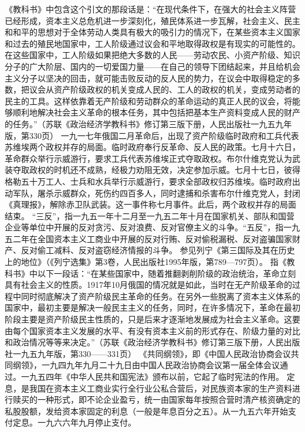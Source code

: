\begin{maonote}
《教科书》中包含这个引文的那段话是：“在现代条件下，在强大的社会主义阵营已经形成，资本主义总危机进一步深刻化，殖民体系进一步瓦解，社会主义、民主和和平的思想对于全体劳动人类具有极大的吸引力的情况下，在某些资本主义国家和过去的殖民地国家中，工人阶级通过议会和平地取得政权是有现实的可能性的。在这些国家中，工人阶级如果把绝大多数的人民——劳动农民、小资产阶级、知识分子的广大阶层、国内的一切爱国力量——在自己的领导下团结起来，并且给机会主义分子以坚决的回击，就可能击败反动的反人民的势力，在议会中取得稳定的多数，把议会从资产阶级政权的机关变成人民的、工人的政权的机关，变成劳动者的民主的工具。这样依靠着无产阶级和劳动群众的革命运动的真正人民的议会，将能够顺利地解决社会主义革命的根本任务，其中包括把基本生产资料变成人民的财产的任务。”（苏联《政治经济学教科书》修订第三版下册，人民出版社一九五九年版，第330页）
一九一七年俄国二月革命后，出现了资产阶级临时政府和工兵代表苏维埃两个政权并存的局面。临时政府奉行反革命、反人民的政策。七月十六日，革命群众举行示威游行，要求工兵代表苏维埃正式夺取政权。布尔什维克党认为武装夺取政权的时机还不成熟，经极力劝阻无效，决定参加示威。七月十七日，彼得格勒五十万工人、士兵和水兵举行示威游行，要求全部政权归苏维埃。临时政府出动军队，屠杀示威群众，死伤约四百多人，同时逮捕和杀害布尔什维克党人，封闭《真理报》，解除赤卫队武装。这一事件称七月事件。此后，两个政权并存的局面结束。
“三反”，指一九五一年十二月至一九五二年十月在国家机关、部队和国营企业等单位中开展的反对贪污、反对浪费、反对官僚主义的斗争。“五反”，指一九五二年在全国资本主义工商业中开展的反对行贿、反对偷税漏税、反对盗骗国家财产、反对偷工减料、反对盗窃经济情报的斗争。
参见列宁《第三国际及其在历史上的地位》（《列宁选集》第3卷，人民出版社1995年版，第789—797页）。
指《教科书》中以下一段话：“在某些国家中，随着推翻剥削阶级的政治统治，革命立刻具有社会主义的性质。1917年10月俄国的情况就是如此，当时在无产阶级革命的过程中同时彻底解决了资产阶级民主革命的任务。在另外一些脱离了资本主义体系的国家中，最初主要是解决一般民主主义的任务，同时，在许多情况下，革命在最初阶段主要是资产阶级民主性质的，只是后来才逐渐地发展成为社会主义革命。这要由每个国家资本主义发展的水平、有没有资本主义前的形式存在、阶级力量的对比和政治情况等等来决定。”（苏联《政治经济学教科书》修订第三版下册，人民出版社一九五九年版，第330——331页）
《共同纲领》，即《中国人民政治协商会议共同纲领》，一九四九年九月二十九日由中国人民政治协商会议第一届全体会议通过。一九五四年《中华人民共和国宪法》颁布以前，它起了临时宪法的作用。
定息，是我国在资本主义工商业实行全行业公私合营后，对民族资本家的生产资料进行赎买的一种形式，即不论企业盈亏，统一由国家每年按照合营时清产核资确定的私股股额，发给资本家固定的利息（一般是年息百分之五）。从一九五六年开始支付定息。一九六六年九月停止支付。

\end{maonote}
